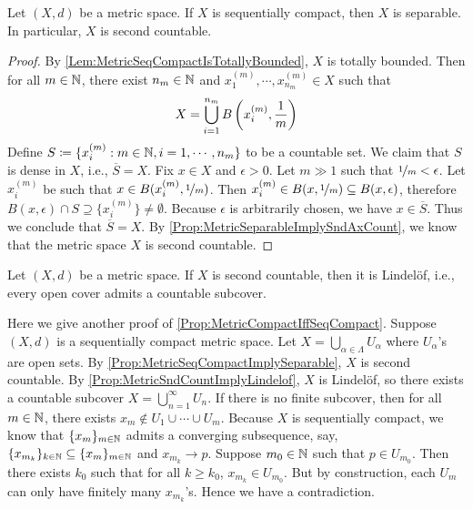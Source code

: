 \documentclass[screen]{techreport}
\numberwithin{equation}{section}
\begin{document}
\begin{proposition}\label{Prop:MetricSeqCompactImplySeparable}
	Let $(X,d)$ be a metric space.
	If $X$ is sequentially compact, then $X$ is separable.
	In particular, $X$ is second countable.
\end{proposition}
\begin{proof}
	By \cref{Lem:MetricSeqCompactIsTotallyBounded}, $X$ is totally bounded.
	Then for all $m \in \mathbb{N}$, there exist $n_m \in \mathbb{N}$ and $x^{(m)}_1,\cdots,x^{(m)}_{n_m} \in X$ such that
	\[
	X = \bigcup_{i=1}^{n_m} B\left({ x^{(m)}_i, \frac{1}{m}}\right) 
	\]
	Define $S \coloneqq \{ x^{(m)}_i : m \in \mathbb{N}, i=1,\cdots,n_m \}$ to be a countable set.
	We claim that $S$ is dense in $X$, i.e., $\overline{S} = X$.
	Fix $x \in X$ and $\epsilon > 0$.
	Let $m \gg 1$ such that $\nicefrac{1}{m} < \epsilon$.
	Let $x^{(m)}_i$ be such that $x \in B(x^{(m)}_i, \nicefrac{1}{m})$.
	Then $x^{(m)}_i \in B(x,\nicefrac{1}{m}) \subseteq B(x,\epsilon)$, therefore $B(x,\epsilon) \cap S \supseteq \{ x^{(m)}_i \} \neq \emptyset$.
	Because $\epsilon$ is arbitrarily chosen, we have $x \in \overline{S}$.
	Thus we conclude that $\overline{S} = X$.
	By \cref{Prop:MetricSeparableImplySndAxCount}, we know that the metric space $X$ is second countable.
\end{proof}

\begin{proposition}\label{Prop:MetricSndCountImplyLindelof}
	Let $(X,d)$ be a metric space.
	If $X$ is second countable, then it is Lindel{\"o}f, i.e., every open cover admits a countable subcover.
\end{proposition}

\begin{remark}\label{Rem:AnotherProofMetricSeqCompactImplyCompact}
	Here we give another proof of \cref{Prop:MetricCompactIffSeqCompact}.
	Suppose $(X,d)$ is a sequentially compact metric space.
	Let $X = \bigcup_{\alpha \in \Lambda} U_\alpha$ where $U_\alpha$'s are open sets.
	By \cref{Prop:MetricSeqCompactImplySeparable}, $X$ is second countable.
	By \cref{Prop:MetricSndCountImplyLindelof}, $X$ is Lindel{\"o}f, so there exists a countable subcover $X = \bigcup_{n=1}^\infty U_n$.
	If there is no finite subcover, then for all $m \in \mathbb{N}$, there exists $x_m \not\in U_1 \cup \cdots \cup U_m$.
	Because $X$ is sequentially compact, we know that $\{x_m\}_{m \in \mathbb{N}}$ admits a converging subsequence, say, $\{x_{m_k}\}_{k \in \mathbb{N}} \subseteq \{ x_m \}_{m \in \mathbb{N}}$ and $x_{m_k} \rightarrow p$.
	Suppose $m_0 \in \mathbb{N}$ such that $p \in U_{m_0}$.
	Then there exists $k_0$ such that for all $k \ge k_0$, $x_{m_k} \in U_{m_0}$.
	But by construction, each $U_m$ can only have finitely many $x_{m_k}$'s.
	Hence we have a contradiction.
\end{remark}
\end{document}
